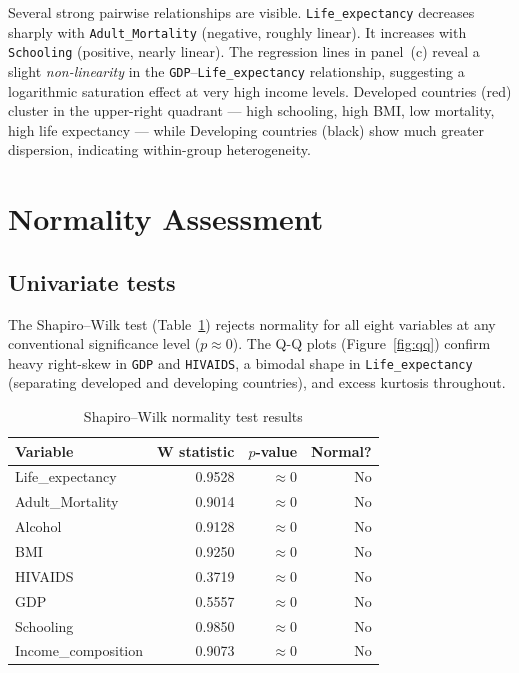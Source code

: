 \documentclass[11pt, a4paper]{article}
\begin{document}
Several strong pairwise relationships are visible. \texttt{Life\_expectancy}
decreases sharply with \texttt{Adult\_Mortality} (negative, roughly linear).
It increases with \texttt{Schooling} (positive, nearly linear).
The regression lines in panel~(c) reveal a slight \emph{non-linearity} in the
\texttt{GDP}–\texttt{Life\_expectancy} relationship, suggesting a logarithmic
saturation effect at very high income levels.
Developed countries (red) cluster in the upper-right quadrant — high schooling,
high BMI, low mortality, high life expectancy — while Developing countries (black)
show much greater dispersion, indicating within-group heterogeneity.

\section{Normality Assessment}

\subsection{Univariate tests}
The Shapiro--Wilk test (Table~\ref{tab:normality}) rejects normality for all eight
variables at any conventional significance level ($p \approx 0$).
The Q-Q plots (Figure~\ref{fig:qq}) confirm heavy right-skew in \texttt{GDP} and
\texttt{HIVAIDS}, a bimodal shape in \texttt{Life\_expectancy}
(separating developed and developing countries), and excess kurtosis throughout.

\begin{table}[H]
\centering
\caption{Shapiro--Wilk normality test results}
\label{tab:normality}
\small
\begin{tabular}{lrrr}
\toprule
\textbf{Variable} & \textbf{W statistic} & \textbf{$p$-value} & \textbf{Normal?}\\
\midrule
Life\_expectancy & 0.9528 & $\approx 0$ & No \\
Adult\_Mortality & 0.9014 & $\approx 0$ & No \\
Alcohol & 0.9128 & $\approx 0$ & No \\
BMI & 0.9250 & $\approx 0$ & No \\
HIVAIDS & 0.3719 & $\approx 0$ & No \\
GDP & 0.5557 & $\approx 0$ & No \\
Schooling & 0.9850 & $\approx 0$ & No \\
Income\_composition & 0.9073 & $\approx 0$ & No \\
\bottomrule
\end{tabular}
\end{table}
\end{document}
